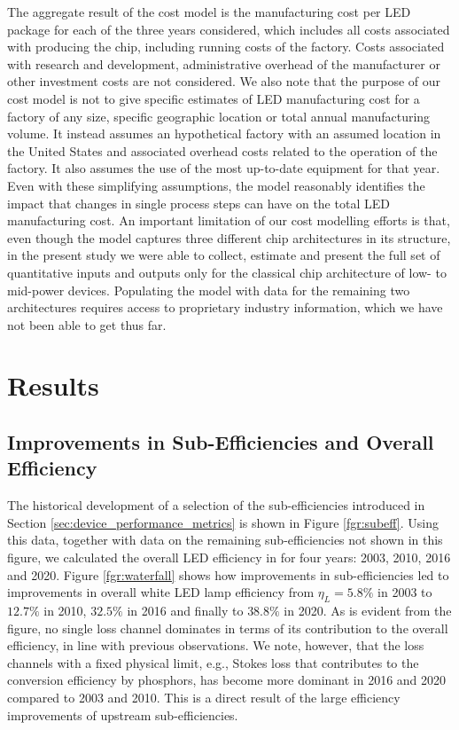 \documentclass[twoside,twocolumn,9pt]{article}
\begin{document}
The aggregate result of the cost model is the manufacturing cost per LED package for each of the three years considered, which includes all costs associated with producing the chip, including running costs of the factory. Costs associated with research and development, administrative overhead of the manufacturer or other investment costs are not considered. We also note that the purpose of our cost model is not to give specific estimates of LED manufacturing cost for a factory of any size, specific geographic location or total annual manufacturing volume. It instead assumes an hypothetical factory with an assumed location in the United States and associated overhead costs related to the operation of the factory. It also assumes the use of the most up-to-date equipment for that year. Even with these simplifying assumptions, the model reasonably identifies the impact that changes in single process steps can have on the total LED manufacturing cost. An important limitation of our cost modelling efforts is that, even though the model captures three different chip architectures in its structure, in the present study we were able to collect, estimate and present the full set of quantitative inputs and outputs only for the classical chip architecture of low- to mid-power devices. Populating the model with data for the remaining two architectures requires access to proprietary industry information, which we have not been able to get thus far.  

\section{Results}

\subsection{Improvements in Sub-Efficiencies and Overall Efficiency}

The historical development of a selection of the sub-efficiencies introduced in Section \ref{sec:device_performance_metrics} is shown in Figure \ref{fgr:subeff}. Using this data, together with data on the remaining sub-efficiencies not shown in this figure, we calculated the overall LED efficiency in for four years: 2003, 2010, 2016 and 2020. Figure \ref{fgr:waterfall} shows how improvements in sub-efficiencies led to improvements in overall white LED lamp efficiency from $\eta_L=5.8\%$ in 2003 to $12.7\%$ in 2010, $32.5\%$ in 2016 and finally to $38.8\%$ in 2020. As is evident from the figure, no single loss channel dominates in terms of its contribution to the overall efficiency, in line with previous observations\cite{tsao2010solid}. We note, however, that the loss channels with a fixed physical limit, e.g., Stokes loss that contributes to the conversion efficiency by phosphors, has become more dominant in 2016 and 2020 compared to 2003 and 2010. This is a direct result of the large efficiency improvements of upstream sub-efficiencies.
\end{document}
